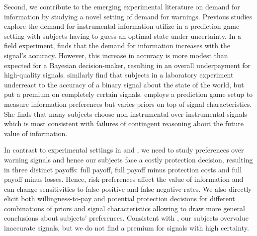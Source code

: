 \documentclass[12pt,a4paper]{article}
\begin{document}

Second, we contribute to the emerging experimental literature on demand for information by studying a novel setting of demand for warnings. Previous studies explore the demand for instrumental information utilize in a prediction game setting with subjects having to guess an optimal state under uncertainty. In a field experiment, \citet{hoffman_how_2016} finds that the demand for information increases with the signal's accuracy. However, this increase in accuracy is more modest than expected for a Bayesian decision-maker, resulting in an overall underpayment for high-quality signals. \citet{ambuehl_belief_2018} similarly find that subjects in a laboratory experiment underreact to the accuracy of a binary signal about the state of the world, but put a premium on completely certain signals. \citet{xu_revealed_2022} employs a prediction game setup to measure information preferences but varies priors on top of signal characteristics. She finds that many subjects choose non-instrumental over instrumental signals which is most consistent with failures of contingent reasoning about the future value of information.  

In contrast to experimental settings in \citet{ambuehl_belief_2018} and \citet{xu_revealed_2022}, we need to study preferences over warning signals and hence our subjects face a costly protection decision, resulting in three distinct payoffs: full payoff, full payoff minus protection costs and full payoff minus losses. Hence, risk preferences affect the value of information and can change sensitivities to false-positive and false-negative rates. We also directly elicit both willingness-to-pay and potential protection decisions for different combinations of priors and signal characteristics allowing to draw more general conclusions about subjects' preferences. Consistent with \citet{ambuehl_belief_2018}, our subjects overvalue inaccurate signals, but we do not find a premium for signals with high certainty.  
\end{document}
